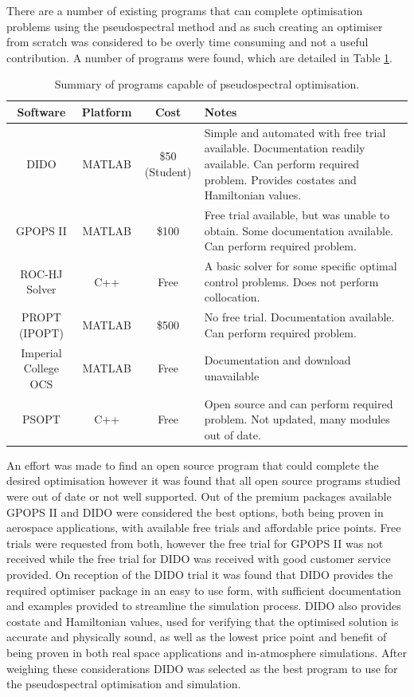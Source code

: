 There are a number of existing programs that can complete optimisation problems using the pseudospectral method and as such creating an optimiser from scratch was considered to be overly time consuming and not a useful contribution. A number of programs were found, which are detailed in Table \ref{table:programs}.
\begin{table}[!ht]
	
	\begin{tabular}{|c|c|c| p{7cm}|}
		\hline \textbf{Software} & \textbf{Platform} & \textbf{Cost} & \textbf{Notes} \\ 
		\hline DIDO & MATLAB & \$50 (Student) & Simple and automated with free trial available. Documentation readily available. Can perform required problem. Provides costates and Hamiltonian values.\\ 
		\hline GPOPS II & MATLAB & \$100 & Free trial available, but was unable to obtain. Some documentation available. Can perform required problem.\\ 
		\hline ROC-HJ Solver & C++ & Free & A basic solver for some specific optimal control problems. Does not perform collocation. \\ 
		\hline PROPT (IPOPT) & MATLAB & \$500 & No free trial. Documentation available. Can perform required problem. \\ 
		\hline Imperial College OCS & MATLAB & Free & Documentation and download unavailable \\ 
		\hline PSOPT & C++ & Free & Open source and can perform required problem. Not updated, many modules out of date. \\ 
		\hline 
	\end{tabular} 
	
	\caption{Summary of programs capable of pseudospectral optimisation.}
	\label{table:programs}
\end{table}
An effort was made to find an open source program that could complete the desired optimisation however it was found that all open source programs studied were out of date or not well supported. Out of the premium packages available GPOPS II and DIDO were considered the best options, both being proven in aerospace applications, with available free trials and affordable price points. Free trials were requested from both, however the free trial for GPOPS II was not received while the free trial for DIDO was received with good customer service provided. On reception of the DIDO trial it was found that DIDO provides the required optimiser package in an easy to use form, with sufficient documentation and examples provided to streamline the simulation process. DIDO also provides costate and Hamiltonian values, used for verifying that the optimised solution is accurate and physically sound, as well as the lowest price point and benefit of being proven in both real space applications and in-atmosphere simulations. After weighing these considerations DIDO was selected as the best program to use for the pseudospectral optimisation and simulation. 

